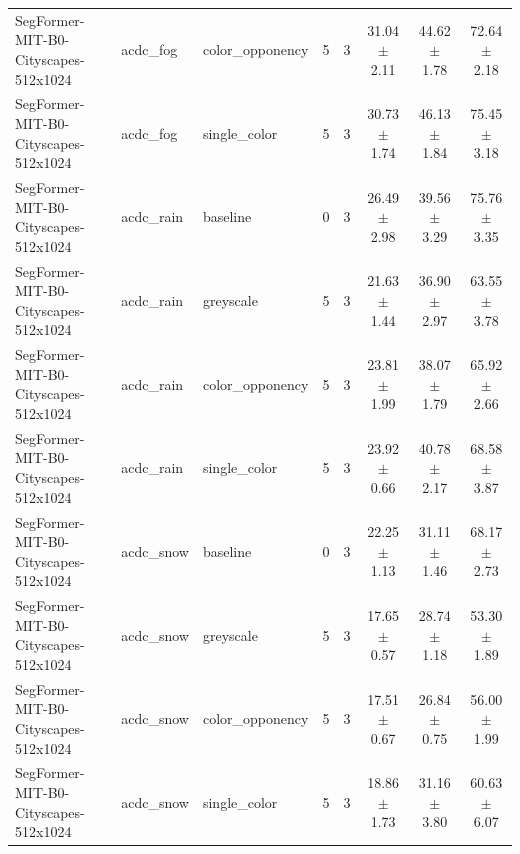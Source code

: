\begin{tabular}{lllccccc}
SegFormer-MIT-B0-Cityscapes-512x1024 & acdc_fog & color_opponency & 5 & 3 & 31.04 $\pm$ 2.11 & 44.62 $\pm$ 1.78 & 72.64 $\pm$ 2.18 \\
SegFormer-MIT-B0-Cityscapes-512x1024 & acdc_fog & single_color & 5 & 3 & 30.73 $\pm$ 1.74 & 46.13 $\pm$ 1.84 & 75.45 $\pm$ 3.18 \\
SegFormer-MIT-B0-Cityscapes-512x1024 & acdc_rain & baseline & 0 & 3 & 26.49 $\pm$ 2.98 & 39.56 $\pm$ 3.29 & 75.76 $\pm$ 3.35 \\
SegFormer-MIT-B0-Cityscapes-512x1024 & acdc_rain & greyscale & 5 & 3 & 21.63 $\pm$ 1.44 & 36.90 $\pm$ 2.97 & 63.55 $\pm$ 3.78 \\
SegFormer-MIT-B0-Cityscapes-512x1024 & acdc_rain & color_opponency & 5 & 3 & 23.81 $\pm$ 1.99 & 38.07 $\pm$ 1.79 & 65.92 $\pm$ 2.66 \\
SegFormer-MIT-B0-Cityscapes-512x1024 & acdc_rain & single_color & 5 & 3 & 23.92 $\pm$ 0.66 & 40.78 $\pm$ 2.17 & 68.58 $\pm$ 3.87 \\
SegFormer-MIT-B0-Cityscapes-512x1024 & acdc_snow & baseline & 0 & 3 & 22.25 $\pm$ 1.13 & 31.11 $\pm$ 1.46 & 68.17 $\pm$ 2.73 \\
SegFormer-MIT-B0-Cityscapes-512x1024 & acdc_snow & greyscale & 5 & 3 & 17.65 $\pm$ 0.57 & 28.74 $\pm$ 1.18 & 53.30 $\pm$ 1.89 \\
SegFormer-MIT-B0-Cityscapes-512x1024 & acdc_snow & color_opponency & 5 & 3 & 17.51 $\pm$ 0.67 & 26.84 $\pm$ 0.75 & 56.00 $\pm$ 1.99 \\
SegFormer-MIT-B0-Cityscapes-512x1024 & acdc_snow & single_color & 5 & 3 & 18.86 $\pm$ 1.73 & 31.16 $\pm$ 3.80 & 60.63 $\pm$ 6.07 \\
\bottomrule
\end{tabular}
